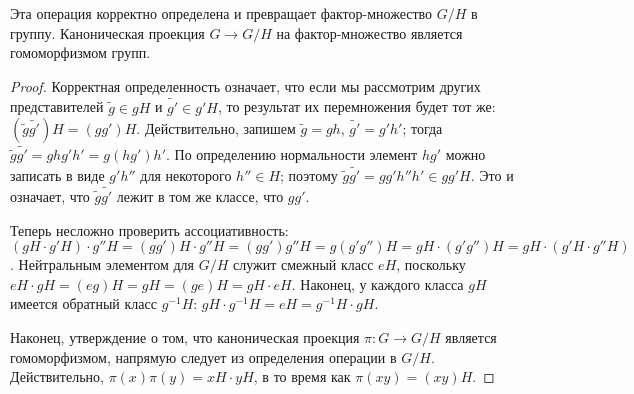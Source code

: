 \begin{theorem}
Эта операция корректно определена и превращает фактор-множество $G/H$
в группу. Каноническая проекция $G\to G/H$ на фактор-множество
является гомоморфизмом групп.
\end{theorem}
\begin{proof}
Корректная определенность означает, что если мы рассмотрим других
представителей $\widetilde{g}\in gH$ и $\widetilde{g'}\in g'H$, то
результат их перемножения будет тот же:
$(\widetilde{g}\widetilde{g'})H = (gg')H$. Действительно,
запишем $\widetilde{g} = gh$, $\widetilde{g'} = g'h'$; тогда
$\widetilde{g}\widetilde{g'} = ghg'h' = g(hg')h'$. По определению
нормальности элемент $hg'$ можно записать в виде $g'h''$ для
некоторого $h''\in H$; поэтому $\widetilde{g}\widetilde{g'} =
gg'h''h'\in gg'H$. Это и означает, что $\widetilde{g}\widetilde{g'}$
лежит в том же классе, что $gg'$.

Теперь несложно проверить ассоциативность: $(gH\cdot g'H)\cdot
g''H = (gg')H\cdot g''H = (gg')g''H = g(g'g'')H = gH\cdot (g'g'')H =
gH\cdot (g'H\cdot g''H)$. Нейтральным элементом для $G/H$ служит
смежный класс $eH$, поскольку $eH\cdot gH = (eg)H = gH = (ge)H =
gH\cdot eH$. Наконец, у каждого класса $gH$ имеется обратный класс
$g^{-1}H$: $gH\cdot g^{-1}H = eH = g^{-1}H\cdot gH$.

Наконец, утверждение о том, что каноническая проекция $\pi\colon G\to
G/H$ является гомоморфизмом, напрямую следует из определения операции
в $G/H$. Действительно, $\pi(x)\pi(y) = xH\cdot yH$, в то время как
$\pi(xy) = (xy)H$.
\end{proof}

